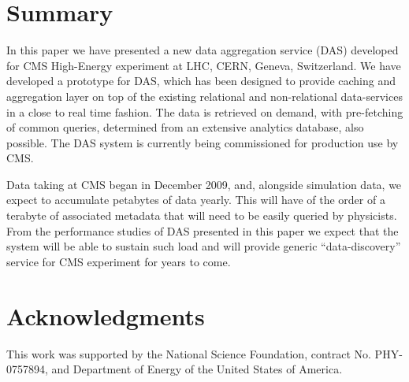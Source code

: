 \documentclass[1p,times]{elsarticle}
\begin{document}
\section{Summary}
In this paper we have presented a new data aggregation service (DAS) 
developed for CMS High-Energy experiment at LHC, CERN, Geneva, Switzerland. 
We have developed a prototype for DAS, which has been designed to provide 
caching and aggregation layer on top of the existing relational and 
non-relational data-services in a close to real time fashion. The data 
is retrieved on demand, with pre-fetching of common queries, 
determined from an extensive analytics database, also possible. 
The DAS system is currently being commissioned for production use by CMS. 

Data taking at CMS began in December 2009, and, alongside simulation 
data, we expect to accumulate petabytes of data yearly. This will have 
of the order of a terabyte of associated metadata that will need to be 
easily queried by physicists. From the performance studies of DAS presented 
in this paper we expect that the system will be able to sustain such load 
and will provide generic “data-discovery” service for CMS experiment for 
years to come.

\section{Acknowledgments}

This work was supported by the National Science Foundation, 
contract No. PHY-0757894, and 
Department of Energy of the United States of America. 
\end{document}
